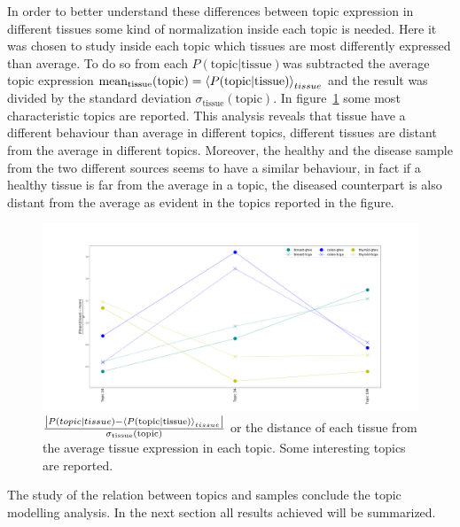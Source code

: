 In order to better understand these differences between topic expression in different tissues some kind of normalization inside each topic is needed. Here it was chosen to study inside each topic which tissues are most differently expressed than average. To do so from each $P(\text{topic}| \text{tissue})$was subtracted the average topic expression $\text{mean}_{\text{tissue}}(\text{topic})=\left\langle P(\text{topic}| \text{tissue})\right\rangle_{tissue}$ and the result was divided by the standard deviation $\sigma_{\text{tissue}}(\text{topic})$. In figure~\ref{fig:topic/merged/lifeplot_normalised_level3_hd} some most characteristic topics are reported. This analysis reveals that tissue have a different behaviour than average in different topics, different tissues are distant from the average in different topics. Moreover, the healthy and the disease sample from the two different sources seems to have a similar behaviour, in fact if a healthy tissue is far from the average in a topic, the diseased counterpart is also distant from the average as evident in the topics reported in the figure.
\begin{figure}[htb!]
	\centering
	\includegraphics[width=0.85\linewidth]{pictures/topic/merged/lifeplot_normalised_level3_hd.pdf}
	\caption{$\frac{\left|P(topic | tissue) - \left\langle P(\text{topic}| \text{tissue})\right\rangle_{tissue}\right|}{\sigma_{\text{tissue}}(\text{topic})}$ or the distance of each tissue from the average tissue expression in each topic. Some interesting topics are reported.}
	\label{fig:topic/merged/lifeplot_normalised_level3_hd}
\end{figure}

The study of the relation between topics and samples conclude the topic modelling analysis. In the next section all results achieved will be summarized.